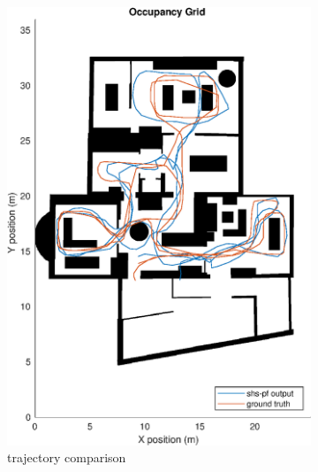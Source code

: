 \begin{figure}[H]
	\centering
	\begin{subfigure}[t]{.45\textwidth}
		\centering
		\includegraphics[width=0.9\linewidth]{images/20201029_1804_shs-pf_trial_3_2}
		\caption{trajectory comparison}
		\label{fig:shspf_trial3_on_map}
	\end{subfigure}
	\begin{subfigure}[t]{.45\textwidth}
		\centering

\end{subfigure}
\end{figure}

